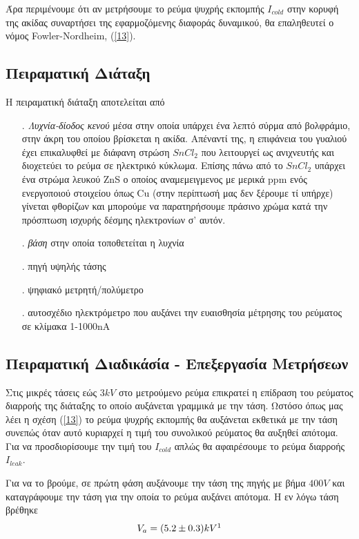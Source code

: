 \documentclass[a4paper]{article}
\begin{document}
Άρα περιμένουμε ότι αν μετρήσουμε το ρεύμα ψυχρής εκπομπής $I_{cold}$ στην κορυφή της ακίδας συναρτήσει της εφαρμοζόμενης διαφοράς δυναμικού, θα επαληθευτεί ο νόμος Fowler-Nordheim, (\ref{13}).

\subsection*{Πειραματική Διάταξη}

Η πειραματική διάταξη αποτελείται από
\begin{itemize}
\item[.] \textit{Λυχνία-δίοδος κενού} μέσα στην οποία υπάρχει ένα λεπτό σύρμα από βολφράμιο, στην άκρη του οποίου βρίσκεται η ακίδα. Απέναντί της, η επιφάνεια του γυαλιού έχει επικαλυφθεί με διάφανη στρώση $SnCl_2$ που λειτουργεί ως ανιχνευτής και διοχετεύει το ρεύμα σε ηλεκτρικό κύκλωμα. Επίσης πάνω από το $SnCl_2$ υπάρχει ένα στρώμα λευκού ZnS ο οποίος αναμεμειγμενος με μερικά ppm ενός ενεργοποιού στοιχείου όπως Cu (στην περίπτωσή μας δεν ξέρουμε τί υπήρχε) γίνεται φθορίζων και μπορούμε να παρατηρήσουμε πράσινο χρώμα κατά την πρόσπτωση ισχυρής δέσμης ηλεκτρονίων σ' αυτόν.

\item[.] \textit{βάση} στην οποία τοποθετείται η λυχνία
\item[.] πηγή υψηλής τάσης
\item[.] ψηφιακό μετρητή/πολύμετρο
\item[.] αυτοσχέδιο ηλεκτρόμετρο που αυξάνει την ευαισθησία μέτρησης του ρεύματος σε κλίμακα 1-1000nA
\end{itemize} 

\subsection*{Πειραματική Διαδικάσία - Επεξεργασία Μετρήσεων}
Στις μικρές τάσεις εώς $3kV$ στο μετρούμενο ρεύμα επικρατεί η επίδραση του ρεύματος διαρροής της διάταξης το οποίο αυξάνεται γραμμικά με την τάση. Ωστόσο όπως μας λέει η σχέση (\ref{13}) το ρεύμα ψυχρής εκπομπής θα αυξάνεται εκθετικά με την τάση συνεπώς όταν αυτό κυριαρχεί η τιμή του συνολικού ρεύματος θα αυξηθεί απότομα. Για να προσδιορίσουμε την τιμή του $I_{cold}$ απλώς θα αφαιρέσουμε το ρεύμα διαρροής $I_{leak}$. 

Για να το βρούμε, σε πρώτη φάση αυξάνουμε την τάση της πηγής με βήμα $400V$ και καταγράφουμε την τάση για την οποία το ρεύμα αυξάνει απότομα. Η εν λόγω τάση βρέθηκε  
\begin{equation*}
V_{a}=(5.2\pm0.3)kV \footnotemark
\end{equation*}
\end{document}
